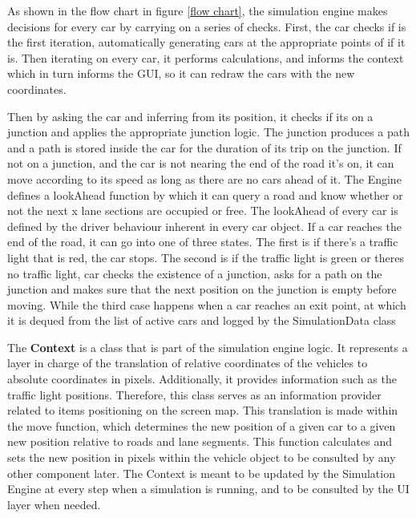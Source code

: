 \documentclass[11pt]{article}
\begin{document}
{\begin{itemize}
As shown in the flow chart in figure \ref{flow chart}, the simulation engine makes decisions for every car by carrying on a series of checks. First, the car checks if is the first iteration, automatically generating cars at the appropriate points of if it is. Then iterating on every car, it performs calculations, and informs  the context which in turn informs the GUI, so it can redraw the cars with the new coordinates. 

Then by asking the car and inferring from its position, it checks if its on a junction and applies the appropriate junction logic. The junction produces a path and a path is stored inside the car for the duration of its trip on the junction. If not on a junction, and the car is not nearing the end of the road it's on, it can move according to its speed as long as there are no cars ahead of it. The Engine defines a lookAhead function by which it can query a road and know whether or not the next x lane sections are occupied or free. The lookAhead of every car is defined by the driver behaviour inherent in every car object. If a car reaches the end of the road, it can go into one of three states. The first is  if there's a traffic light that is red, the car stops. The second is if the traffic light is green or theres no traffic light, car checks the existence of a junction, asks for a path on the junction and makes sure that the next position on the junction is empty before moving. While the third case happens when a car reaches an exit point, at which it is dequed from the list of active cars and logged by the SimulationData class 


The \textbf{Context} is a class that is part of the simulation engine logic. It represents a layer in charge of the translation of relative coordinates of the vehicles to absolute coordinates in pixels. Additionally, it provides information such as the traffic light positions. Therefore, this class serves as an information provider related to items positioning on the screen map.
This translation is made within the move function, which determines the new position of a given car to a given new position relative to roads and lane segments. This function calculates and sets the new position in pixels within the vehicle object to be consulted by any other component later.
The Context is meant to be updated by the Simulation Engine at every step when a simulation is running, and to be consulted by the UI layer when needed.




\end{itemize}}
\end{document}
